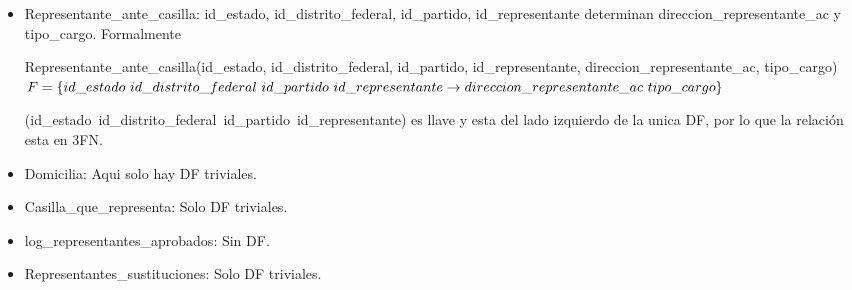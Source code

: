 \documentclass[a4paper,twoside,11pt]{article}
\begin{document}
\begin{itemize}
  \item Representante\_ante\_casilla: id\_estado, id\_distrito\_federal, id\_partido, id\_representante determinan
        direccion\_representante\_ac y tipo\_cargo. Formalmente

        Representante\_ante\_casilla(id\_estado, id\_distrito\_federal, id\_partido, id\_representante,
        direccion\_representante\_ac, tipo\_cargo)\\
        $F=\{id\_estado~id\_distrito\_federal~id\_partido~id\_representante\rightarrow\\
        direccion\_representante\_ac~tipo\_cargo\}$

        (id\_estado~id\_distrito\_federal~id\_partido~id\_representante) es llave y esta del lado izquierdo de la unica DF,
        por lo que la relación esta en 3FN.

  \item Domicilia: Aqui solo hay DF triviales.
  \item Casilla\_que\_representa: Solo DF triviales.
  \item log\_representantes\_aprobados: Sin DF.
  \item Representantes\_sustituciones: Solo DF triviales.

\end{itemize}
\end{document}

